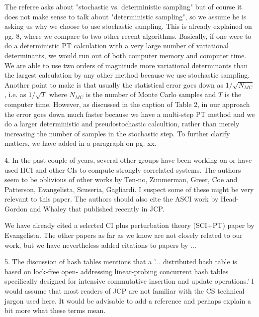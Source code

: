 \documentclass[
preprint,
onecolumn,
 superscriptaddress,
 amsmath,amssymb,
 aps,
]{revtex4-1}
\begin{document}
The referee asks about "stochastic vs. deterministic sampling" but of course it does not make
sense to talk about "deterministic sampling", so we assume he is asking us why we choose to
use stochastic sampling.  This is already explained on pg. 8, where we compare to two other
recent algorithms.  Basically, if one were to do a deterministic PT calculation with a very
large number of variational determinants, we would run out of both computer memory and computer time.
We are able to use two orders of magnitude more variational determinants than the largest
calculation by any other method because we use stochastic sampling.
Another point to make is that usually the statistical error goes down as $1/\sqrt{N_{MC}}$, i.e.
as $1/\sqrt{T}$ where $N_{MC}$ is the number of Monte Carlo samples and $T$ is the computer time.
However, as discussed in the caption of Table 2, in our approach the error goes down much faster because
we have a multi-step PT method and we do a larger deterministic and pseudostochastic calcultion,
rather than merely increasing the number of samples in the stochastic step.
To further clarify matters, we have added in a paragraph on pg. xx.


\vskip 5mm {\color{blue}

4. In the past couple of years, several other groups have been working on or have used HCI and
other CIs to compute strongly correlated systems. The authors seem to be oblivious of other
works by Ten-no, Zimmerman, Greer, Coe and Patterson, Evangelista, Scuseria, Gagliardi. I
suspect some of these might be very relevant to this paper. The authors should also cite the
ASCI work by Head-Gordon and Whaley that published recently in JCP.
}\color{black}

We have already cited a selected CI plus perturbation theory (SCI+PT) paper by Evangelista.
The other papers as far as we know are not
closely related to our work, but we have nevertheless added citations to papers by ...

\vskip 5mm {\color{blue}

5. The discussion of hash tables mentions that a '... distributed hash table is based on
lock-free open- addressing linear-probing concurrent hash tables specifically designed for
intensive commutative insertion and update operations.' I would assume that most readers of
JCP are not familiar with the CS technical jargon used here. It would be advisable to add a
reference and perhaps explain a bit more what these terms mean.
}\color{black}
\end{document}
